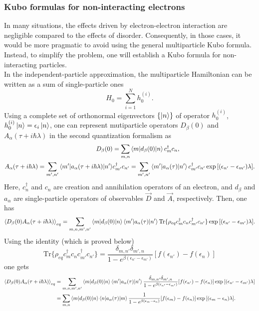 \documentclass[a4paper,12pts,dvipsnames]{article}
\numberwithin{equation}{section}
\begin{document}
\subsubsection{Kubo formulas for non-interacting electrons}
In many situations, the effects driven by electron-electron interaction are negligible compared to the effects of disorder. Consequently, in those cases, it would be more pragmatic to avoid using the general multiparticle Kubo formula. Instead, to simplify the problem, one will establish a Kubo formula for non-interacting particles.\\
In the independent-particle approximation, the multiparticle Hamiltonian can be written as a sum of single-particle ones
\begin{equation}
	H_0 = \sum_{i=1}^Nh^{(i)}_0.
\end{equation}
Using a complete set of orthonormal eigenvectors $\{\ket{n}\}$ of operator $h^{(i)}_0$, $h^{(i)}_0\ket{n}=\epsilon_i\ket{n}$, one can represent mutiparticle operators $D_{\beta}(0)$ and $A_{\alpha}(\tau+i\hbar\lambda)$ in the second quantization formalism as
\begin{align}
	D_{\beta}(0) &= \sum_{m,n}\braket{m|d_{\beta}(0)|n} c^{\dagger}_mc_n,\\
	A_{\alpha}(\tau+i\hbar\lambda) = \sum_{m',n'}\braket{m'|a_{\alpha}(\tau+i\hbar\lambda)|n'}& c^{\dagger}_{m'}c_{n'} = \sum_{m',n'}\braket{m'|a_{\alpha}(\tau)|n'} c^{\dagger}_{m'}c_{n'} \exp{\left[(\epsilon_{n'}-\epsilon_{m'})\lambda\right]}.
\end{align}
Here, $c^{\dagger}_n$ and $c_n$ are creation and annihilation operators of an electron, and $d_{\beta}$ and $a_{\alpha}$ are single-particle operators of observables $\vec{D}$ and $\vec{A}$, respectively. Then, one has
\begin{align}
	\braket{D_{\beta}(0)A_{\alpha}(\tau+i\hbar\lambda)}_{eq} = \sum_{m,n,m',n'}\braket{m|d_{\beta}(0)|n}\braket{m'|a_{\alpha}(\tau)|n'}\text{Tr}\{\rho_{eq}c^{\dagger}_mc_nc^{\dagger}_{m'}c_{n'}\}\exp{\left[(\epsilon_{n'}-\epsilon_{m'})\lambda\right]}.
\end{align}
Using the identity (which is proved below)
\begin{equation}\label{bloch dominicis}
	\text{Tr}\{\rho_{eq}c^{\dagger}_mc_nc^{\dagger}_{m'}c_{n'}\} = \frac{\delta_{m,n'}\delta_{m',n}}{1-e^{\beta\left(\epsilon_{n'}-\epsilon_{m'}\right)}}[f(\epsilon_{n'}) - f(\epsilon_{n})]
\end{equation}
one gets
\begin{align}
	\braket{D_{\beta}(0)A_{\alpha}(\tau+i\hbar\lambda)}_{eq} &= \sum_{m,n,m',n'}\braket{m|d_{\beta}(0)|n}\braket{m'|a_{\alpha}(\tau)|n'}\frac{\delta_{m,n'}\delta_{m',n}}{1-e^{\beta\left(\epsilon_{n'}-\epsilon_{m'}\right)}}[f(\epsilon_{n'}) - f(\epsilon_{n})]\exp{\left[(\epsilon_{n'}-\epsilon_{m'})\lambda\right]}\\
	&= \sum_{m,n}\braket{m|d_{\beta}(0)|n}\braket{n|a_{\alpha}(\tau)|m}\frac{1}{1-e^{\beta\left(\epsilon_{m}-\epsilon_{n}\right)}}[f(\epsilon_{m}) - f(\epsilon_{n})]\exp{\left[(\epsilon_{m}-\epsilon_{n})\lambda\right]}.
\end{align}
\end{document}
